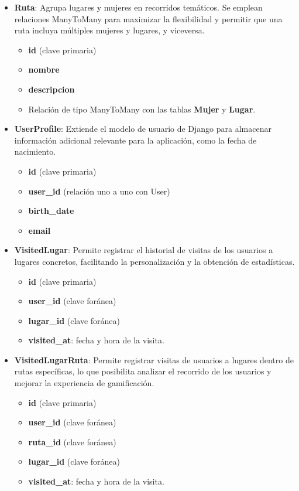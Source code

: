 \begin{itemize}
    \item \textbf{Ruta}: Agrupa lugares y mujeres en recorridos temáticos. Se emplean relaciones ManyToMany para maximizar la flexibilidad y permitir que una ruta incluya múltiples mujeres y lugares, y viceversa.
    \begin{itemize}
        \item \textbf{id} (clave primaria)
        \item \textbf{nombre}
        \item \textbf{descripcion}
        \item Relación de tipo ManyToMany con las tablas \textbf{Mujer} y \textbf{Lugar}.
    \end{itemize}
    \item \textbf{UserProfile}: Extiende el modelo de usuario de Django para almacenar información adicional relevante para la aplicación, como la fecha de nacimiento.
    \begin{itemize}
        \item \textbf{id} (clave primaria)
        \item \textbf{user\_id} (relación uno a uno con User)
        \item \textbf{birth\_date}
        \item \textbf{email}
    \end{itemize}
    \item \textbf{VisitedLugar}: Permite registrar el historial de visitas de los usuarios a lugares concretos, facilitando la personalización y la obtención de estadísticas.
    \begin{itemize}
        \item \textbf{id} (clave primaria)
        \item \textbf{user\_id} (clave foránea)
        \item \textbf{lugar\_id} (clave foránea)
        \item \textbf{visited\_at}: fecha y hora de la visita.
    \end{itemize}
    \item \textbf{VisitedLugarRuta}: Permite registrar visitas de usuarios a lugares dentro de rutas específicas, lo que posibilita analizar el recorrido de los usuarios y mejorar la experiencia de gamificación.
    \begin{itemize}
        \item \textbf{id} (clave primaria)
        \item \textbf{user\_id} (clave foránea)
        \item \textbf{ruta\_id} (clave foránea)
        \item \textbf{lugar\_id} (clave foránea)
        \item \textbf{visited\_at}: fecha y hora de la visita.
    \end{itemize}
\end{itemize}

